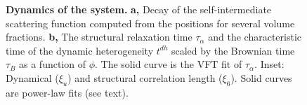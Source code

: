 \begin{figure}
	\caption{\textbf{Dynamics of the system.} {\bf a,} Decay of the self-intermediate scattering function computed from the positions for several volume fractions. {\bf b,} The structural relaxation time $\tau_\alpha$ and the characteristic time of the dynamic heterogeneity $t^{dh}$ scaled by the Brownian time $\tau_B$ as a function of $\phi$. The solid curve is the VFT fit of $\tau_\alpha$. Inset: Dynamical ($\xi_u$) and structural correlation length ($\xi_6$). Solid curves are power-law fits (see text).}
	\label{fig:vft}
\end{figure}

